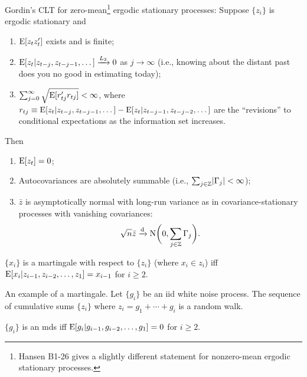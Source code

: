 \documentclass[8pt,letterpaper, landscape]{extarticle} %
\begin{document}
\begin{multicols}{3}
\begin{description}
Gordin's CLT for zero-mean\footnote{Hansen B1-26 gives a slightly different statement for nonzero-mean ergodic stationary processes.} ergodic stationary processes: Suppose $ \{ z_i \} $ is ergodic stationary and
\begin{enumerate}
\item $ \operatorname{E} [z_t z_{t}'] $ exists and is finite;
\item $ \operatorname{E} [z_t | z_{t-j} , z_{t-j-1} , \dotsc ] \xrightarrow{L_2} 0 $ as $ j \to \infty $ (i.e., knowing about the distant past does you no good in estimating today);
\item $ \sum_{j=0}^{\infty} \sqrt{\operatorname{E} [r_{tj}' r_{tj}]} < \infty $, where $ r_{tj} \equiv \operatorname{E} [z_t | z_{t-j} , z_{t-j-1} , \dotsc ] - \operatorname{E} [z_t | z_{t-j-1} , z_{t-j-2} , \dotsc ] $ are the ``revisions'' to conditional expectations as the information set increases.
\end{enumerate}
Then
\begin{enumerate}
\item $ \operatorname{E} [z_t] = 0 $;
\item Autocovariances are absolutely summable (i.e., $ \sum_{j \in \mathbb{Z}} \lvert \Gamma_{j} \rvert < \infty $);
\item $ \bar{z} $ is asymptotically normal with long-run variance as in covariance-stationary processes with vanishing covariances:
\[ \sqrt{n} \bar{z} \xrightarrow{\text{d}} \operatorname{N} \biggl( 0, \sum_{j \in \mathbb{Z}} \Gamma_j \biggr). \]
\end{enumerate}

 $ \{ x_i \} $ is a martingale with respect to $ \{ z_i \} $ (where $ x_i \in z_i $) iff $ \operatorname{E} [x_i | z_{i-1}, z_{i-2}, \dotsc , z_{1}] = x_{i - 1} $ for $ i \geq 2 $.

 An example of a martingale. Let $ \{ g_i \} $ be an iid white noise process. The sequence of cumulative sums $ \{ z_i \} $ where $ z_i = g_1 + \dotsb + g_i $ is a random walk.

 $ \{ g_i \} $ is an mds iff
$ \operatorname{E} [g_i | g_{i-1}, g_{i-2}, \dotsc , g_{1}] = 0 $ for $ i \geq 2 $.


\end{description}
\end{multicols}
\end{document}
